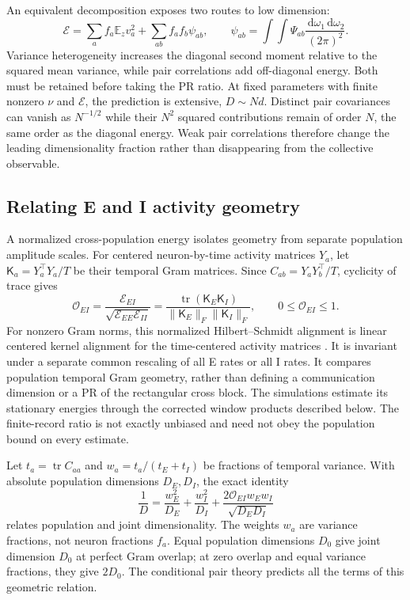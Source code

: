 \documentclass[11pt]{article}
\newcommand{\E}{\mathbb E}
\newcommand{\dd}{\,\mathrm d}
\newcommand{\tr}{\operatorname{tr}}
\newcommand{\energy}{\mathcal E}
\begin{document}
An equivalent decomposition exposes two routes to low dimension:
\begin{equation}
 \energy=\sum_af_a\E_zv_a^2+\sum_{ab}f_af_b\psi_{ab},\qquad
 \psi_{ab}=\int\!\!\int\Psi_{ab}\frac{\dd\omega_1\dd\omega_2}{(2\pi)^2}.
 \label{eq:diagonal}
\end{equation}
Variance heterogeneity increases the diagonal second moment relative to the
squared mean variance, while pair correlations add off-diagonal energy.
Both must be retained before taking the PR ratio.
At fixed parameters with finite nonzero $\nu$ and $\energy$, the prediction
is extensive, $D\sim Nd$. Distinct pair covariances can vanish as
$N^{-1/2}$ while their $N^2$ squared contributions remain of order $N$,
the same order as the diagonal energy. Weak pair correlations therefore
change the leading dimensionality fraction rather than disappearing from
the collective observable.

\subsection{Relating E and I activity geometry}

A normalized cross-population energy isolates geometry from separate
population amplitude scales. For centered neuron-by-time activity matrices
$Y_a$, let $\mathsf K_a=Y_a^\top Y_a/T$ be their temporal Gram matrices.
Since $C_{ab}=Y_aY_b^\top/T$, cyclicity of trace gives
\begin{equation}
 \mathcal O_{EI}
 =\frac{\energy_{EI}}{\sqrt{\energy_{EE}\energy_{II}}}
 =\frac{\tr(\mathsf K_E\mathsf K_I)}
        {\|\mathsf K_E\|_F\|\mathsf K_I\|_F},\qquad
 0\leq\mathcal O_{EI}\leq1.
 \label{eq:temporalalignment}
\end{equation}
For nonzero Gram norms, this normalized Hilbert--Schmidt alignment is linear centered kernel
alignment for the time-centered activity matrices \citep{kornblith2019}.
It is invariant under a separate common rescaling of all E rates or all I
rates. It compares population temporal Gram geometry, rather than defining
a communication dimension or a PR of the rectangular cross block.
The simulations estimate its stationary energies through the corrected
window products described below. The finite-record ratio is not exactly
unbiased and need not obey the population bound on every estimate.

Let $t_a=\tr C_{aa}$ and $w_a=t_a/(t_E+t_I)$ be fractions of temporal
variance. With absolute population dimensions $D_E,D_I$, the exact identity
\begin{equation}
 \boxed{\frac1D=\frac{w_E^2}{D_E}+\frac{w_I^2}{D_I}
      +\frac{2\mathcal O_{EI}w_Ew_I}{\sqrt{D_ED_I}}}
 \label{eq:jointgeometry}
\end{equation}
relates population and joint dimensionality. The weights $w_a$ are variance
fractions, not neuron fractions $f_a$. Equal population dimensions $D_0$
give joint dimension $D_0$ at perfect Gram overlap; at zero overlap and equal
variance fractions, they give $2D_0$. The conditional pair theory predicts
all the terms of this geometric relation.
\end{document}
